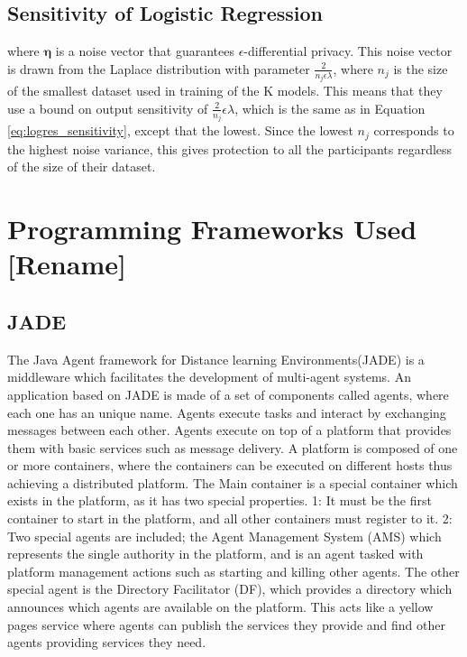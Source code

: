 \subsection{Sensitivity of Logistic Regression}

where $\boldsymbol{\eta}$ is a noise vector that guarantees $\epsilon$-differential privacy. This noise vector is drawn from the Laplace distribution with parameter $\frac{2}{n_j\epsilon\lambda}$, where $n_j$ is the size of the smallest dataset used in training of the K models. This means that they use a bound on output sensitivity of $\frac{2}{n_j}\epsilon\lambda$, which is the same as in Equation \ref{eq:logres_sensitivity}, except that the lowest. Since the lowest $n_j$ corresponds to the highest noise variance, this gives protection to all the participants regardless of the size of their dataset.
	


 \section{Programming Frameworks Used [Rename]}

 \subsection{JADE}
 The Java Agent framework for Distance learning Environments(JADE) is a middleware which facilitates the development of multi-agent systems. An application based on JADE is made of a set of components called agents, where each one has an unique name. Agents execute tasks and interact by exchanging messages between each other. Agents execute on top of a platform that provides them with basic services such as message delivery. A platform is composed of one or more containers, where the containers can be executed on different hosts thus achieving a distributed platform. The Main container is a special container which exists in the platform, as it has two special properties. 1: It must be the first container to start in the platform, and all other containers must register to it. 2: Two special agents are included; the Agent Management System (AMS) which represents the single authority in the platform, and is an agent tasked with platform management actions such as starting and killing other agents. The other special agent is the Directory Facilitator (DF), which provides a directory which announces which agents are available on the platform. This acts like a yellow pages service where agents can publish the services they provide and find other agents providing services they need.


